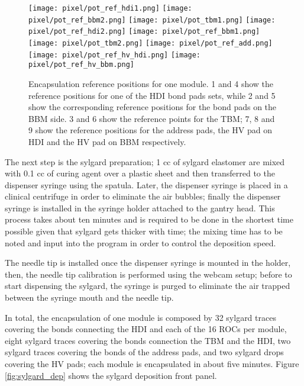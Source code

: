 \begin{figure}[h]
\centering
  \texttt{[image: pixel/pot\_ref\_hdi1.png]}
  \texttt{[image: pixel/pot\_ref\_bbm2.png]}
  \texttt{[image: pixel/pot\_tbm1.png]}
  \texttt{[image: pixel/pot\_ref\_hdi2.png]}
  \texttt{[image: pixel/pot\_ref\_bbm1.png]}
  \texttt{[image: pixel/pot\_tbm2.png]}
  \texttt{[image: pixel/pot\_ref\_add.png]}
  \texttt{[image: pixel/pot\_ref\_hv\_hdi.png]}
  \texttt{[image: pixel/pot\_ref\_hv\_bbm.png]}
 \caption[Encapsulation reference positions.]{Encapsulation reference positions for one module. 1 and 4 show the reference positions for one of the HDI bond pads sets, while 2 and 5 show the corresponding reference positions for the bond pads on the BBM side. 3 and 6 show the reference points for the TBM; 7, 8 and 9 show the reference positions for the address pads, the HV pad on HDI and the HV pad on BBM respectively.}\label{fig:potting_references}
\end{figure}

The next step is the sylgard preparation; 1 cc of sylgard elastomer are mixed with 0.1 cc of curing agent over a plastic sheet and then transferred to the dispenser syringe using the spatula. Later, the dispenser syringe is placed in a clinical centrifuge in order to eliminate the air bubbles; finally the dispenser syringe is installed in the syringe holder attached to the gantry head. This process takes about ten minutes and is required to be done in the shortest time possible given that sylgard gets thicker with time; the mixing time has to be noted and input into the program in order to control the deposition speed.

The needle tip is installed once the dispenser syringe is mounted in the holder, then, the needle tip calibration is performed using the webcam setup; before to start dispensing the sylgard, the syringe is purged to eliminate the air trapped between the syringe mouth and the needle tip.

In total, the encapsulation of one module is composed by 32 sylgard traces covering the bonds connecting the HDI and each of the 16 ROCs per module, eight sylgard traces covering the bonds connection the TBM and the HDI, two sylgard traces covering the bonds of the address pads, and two sylgard drops covering the HV pads; each module is encapsulated in about five minutes. Figure \ref{fig:sylgard_dep} shows the sylgard deposition front panel. 

